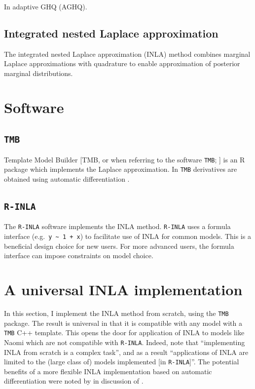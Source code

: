 \documentclass[a4paper, nobind]{templates/ociamthesis}
\begin{document}
In adaptive GHQ (AGHQ).

\hypertarget{integrated-nested-laplace-approximation}{%
\subsection{Integrated nested Laplace approximation}\label{integrated-nested-laplace-approximation}}

The integrated nested Laplace approximation (INLA) method \autocite{rue2009approximate} combines marginal Laplace approximations with quadrature to enable approximation of posterior marginal distributions.

\hypertarget{software}{%
\section{Software}\label{software}}

\hypertarget{tmb}{%
\subsection{\texorpdfstring{\texttt{TMB}}{TMB}}\label{tmb}}

Template Model Builder {[}TMB, or when referring to the software \texttt{TMB}; \textcite{kristensen2016tmb}{]} is an R package which implements the Laplace approximation.
In \texttt{TMB} derivatives are obtained using automatic differentiation \autocite{baydin2017automatic}.

\hypertarget{r-inla}{%
\subsection{\texorpdfstring{\texttt{R-INLA}}{R-INLA}}\label{r-inla}}

The \texttt{R-INLA} software implements the INLA method.
\texttt{R-INLA} uses a formula interface (e.g.~\texttt{y\ \textasciitilde{}\ 1\ +\ x}) to facilitate use of INLA for common models.
This is a beneficial design choice for new users.
For more advanced users, the formula interface can impose constraints on model choice.

\hypertarget{a-universal-inla-implementation}{%
\section{A universal INLA implementation}\label{a-universal-inla-implementation}}

In this section, I implement the INLA method from scratch, using the \texttt{TMB} package.
The result is universal in that it is compatible with any model with a \texttt{TMB} C++ template.
This opens the door for application of INLA to models like Naomi which are not compatible with \texttt{R-INLA}.
Indeed, \textcite{martino2019integrated} note that ``implementing INLA from scratch is a complex task'', and as a result ``applications of INLA are limited to the (large class of) models implemented {[}in \texttt{R-INLA}{]}''.
The potential benefits of a more flexible INLA implementation based on automatic differentiation were noted by \textcite{skaug2009approximate} in discussion of \textcite{rue2009approximate}.
\end{document}
